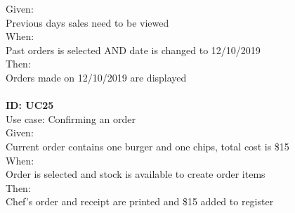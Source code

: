 Given: \\
Previous days sales need to be viewed\\
When: \\
Past orders is selected AND date is changed to 12/10/2019\\
Then:\\
Orders made on 12/10/2019 are displayed\\
\\
\textbf{ID: UC25\\}
Use case: Confirming an order\\
Given: \\
Current order contains one burger and one chips, total cost is \$15\\
When: \\
Order is selected and stock is available to create order items\\
Then:\\
Chef's order and receipt are printed and \$15 added to register\\
\\

